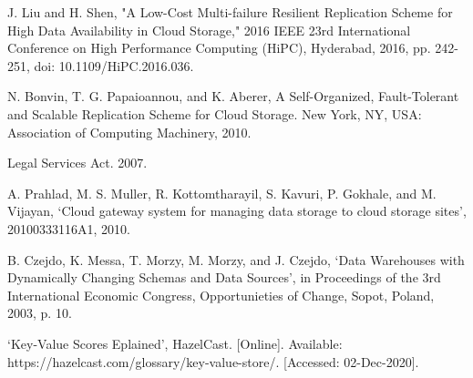 \documentclass{UoYCSproject}
\begin{document}
\begin{thebibliography}{100}
J. Liu and H. Shen, "A Low-Cost Multi-failure Resilient Replication Scheme for High Data Availability in Cloud Storage," 2016 IEEE 23rd International Conference on High Performance Computing (HiPC), Hyderabad, 2016, pp. 242-251, doi: 10.1109/HiPC.2016.036.

N. Bonvin, T. G. Papaioannou, and K. Aberer, A Self-Organized, Fault-Tolerant and Scalable Replication Scheme for Cloud Storage. New York, NY, USA: Association of Computing Machinery, 2010.

Legal Services Act. 2007.

A. Prahlad, M. S. Muller, R. Kottomtharayil, S. Kavuri, P. Gokhale, and M. Vijayan, ‘Cloud gateway system for managing data storage to cloud storage sites’, 20100333116A1, 2010.

B. Czejdo, K. Messa, T. Morzy, M. Morzy, and J. Czejdo, ‘Data Warehouses with Dynamically Changing Schemas and Data Sources’, in Proceedings of the 3rd International Economic Congress, Opportunieties of Change, Sopot, Poland, 2003, p. 10.

‘Key-Value Scores Eplained’, HazelCast. [Online]. Available: https://hazelcast.com/glossary/key-value-store/. [Accessed: 02-Dec-2020].

\end{thebibliography}
\end{document}
